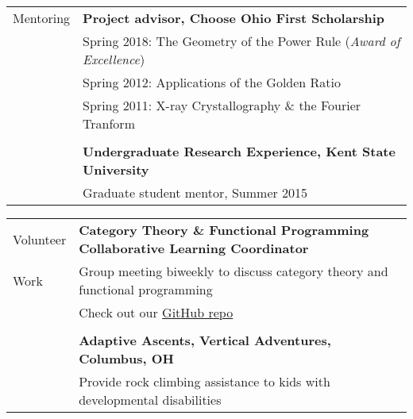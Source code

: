\documentclass[letterpaper,10pt,oneside]{article}
\begin{document}
\vfill


\noindent \begin{tabular}{@{} l l}
 \Large{Mentoring} & \textbf{Project advisor, Choose Ohio First Scholarship} \\
 \hspace{1.1in} & Spring 2018: The Geometry of the Power Rule (\emph{Award of Excellence}) \\
 & Spring 2012: Applications of the Golden Ratio \\
 & Spring 2011: X-ray Crystallography \& the Fourier Tranform \\
 \hspace{1.1in} & \\
 & \textbf{Undergraduate Research Experience, Kent State University} \\
 & Graduate student mentor, Summer 2015 \\
\end{tabular}

\vfill


\noindent \begin{tabular}{@{} l l}
 \Large{Volunteer} & \textbf{Category Theory \& Functional Programming Collaborative Learning Coordinator} \\
 \Large{Work} & Group meeting biweekly to discuss category theory and functional programming \\
 \hspace{1.1in} & Check out our \href{https://github.com/Isaac-DeFrain/Cats-FunProg}{GitHub repo} \\
 & \\
 & \textbf{Adaptive Ascents, Vertical Adventures, Columbus, OH} \\
 & Provide rock climbing assistance to kids with developmental disabilities \\
\end{tabular}
\end{document}
